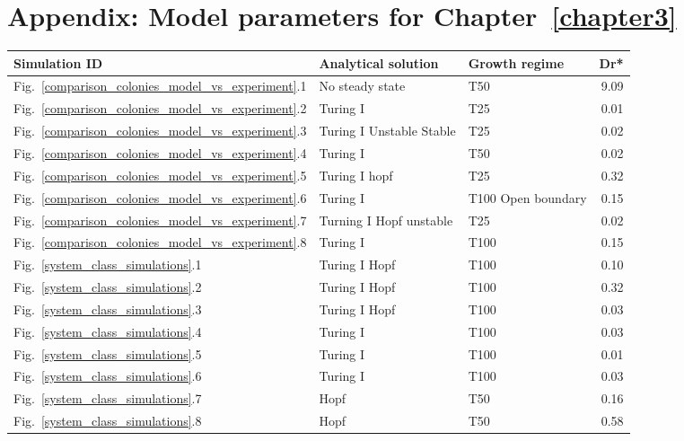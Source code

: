 \chapter{Appendix: Model parameters for Chapter~\ref{chapter3}}
\begin{table}
    \centering
    \begin{adjustbox}{center}
        \begin{tabular}{lllr}
            \toprule
            \textbf{Simulation ID} & \textbf{Analytical solution} & \textbf{Growth regime} & \textbf{Dr*} \\
            \midrule
             Fig.~\ref{comparison_colonies_model_vs_experiment}.1 & No steady state & T50 & 9.09 \\
             Fig.~\ref{comparison_colonies_model_vs_experiment}.2 & Turing I & T25 & 0.01 \\
             Fig.~\ref{comparison_colonies_model_vs_experiment}.3 & Turing I Unstable Stable & T25 & 0.02 \\
             Fig.~\ref{comparison_colonies_model_vs_experiment}.4 & Turing I & T50 & 0.02 \\
             Fig.~\ref{comparison_colonies_model_vs_experiment}.5 & Turing I hopf & T25 & 0.32 \\
             Fig.~\ref{comparison_colonies_model_vs_experiment}.6 & Turing I & T100 Open boundary & 0.15 \\
             Fig.~\ref{comparison_colonies_model_vs_experiment}.7 & Turning I Hopf unstable & T25 & 0.02 \\
             Fig.~\ref{comparison_colonies_model_vs_experiment}.8 & Turing I & T100 & 0.15 \\
             Fig.~\ref{system_class_simulations}.1 & Turing I Hopf & T100 & 0.10 \\
             Fig.~\ref{system_class_simulations}.2 & Turing I Hopf & T100 & 0.32 \\
             Fig.~\ref{system_class_simulations}.3 & Turing I Hopf & T100 & 0.03 \\
             Fig.~\ref{system_class_simulations}.4 & Turing I & T100 & 0.03 \\
             Fig.~\ref{system_class_simulations}.5 & Turing I & T100 & 0.01 \\
             Fig.~\ref{system_class_simulations}.6 & Turing I & T100 & 0.03 \\
             Fig.~\ref{system_class_simulations}.7 & Hopf & T50 & 0.16 \\
             Fig.~\ref{system_class_simulations}.8 & Hopf & T50 & 0.58 \\

\end{tabular}
\end{adjustbox}
\end{table}
